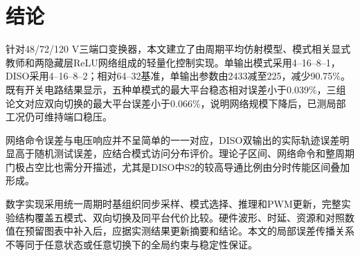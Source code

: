 \documentclass[UTF8,fontset=fandol,a4paper,twocolumn,10pt]{ctexart}
\begin{document}
\begin{center}
\label{fig:16}\end{center}


\section{结论}

针对48/72/120 V三端口变换器，本文建立了由周期平均仿射模型、模式相关显式教师和两隐藏层ReLU网络组成的轻量化控制实现。单输出模式采用4–16–8–1，DISO采用4–16–8–2；相对64–32基准，单输出参数由2433减至225，减少90.75\%。既有开关电路结果显示，五种单模式的最大平台稳态相对误差小于0.039\%，三组论文对应双向切换的最大平台误差小于0.066\%，说明网络规模下降后，已测局部工况仍可维持端口稳压。

网络命令误差与电压响应并不呈简单的一一对应，DISO双输出的实际轨迹误差明显高于随机测试误差，应结合模式访问分布评价。理论子区间、网络命令和整周期门极占空比也需分开描述，尤其是DISO中S2的较高导通比例由分时传能区间叠加形成。

数字实现采用统一周期时基组织同步采样、模式选择、推理和PWM更新，完整实验结构覆盖五模式、双向切换及同平台代价比较。硬件波形、时延、资源和对照数值在预留图表中补入后，应据实测结果更新摘要和结论。本文的局部误差传播关系不等同于任意状态或任意切换下的全局约束与稳定性保证。
\end{document}

